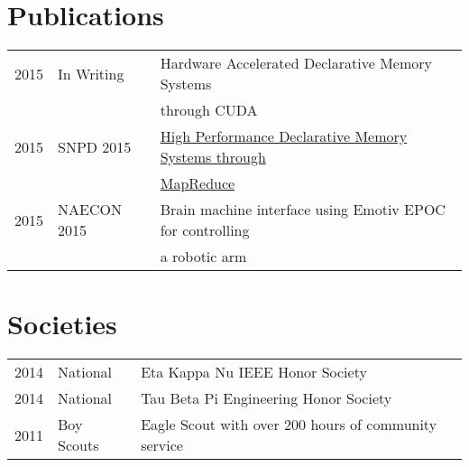 \documentclass[letterpaper]{deedy-resume} %
\begin{document}
\begin{minipage}[t]{0.66\textwidth}
\sectionspace %



\section{Publications} 

\begin{tabular}{rll}
2015 	 & In Writing  & Hardware Accelerated Declarative Memory Systems \\
 		 & 			   & through CUDA\\
2015	 & SNPD 2015   & \href{http://ieeexplore.ieee.org/xpl/articleDetails.jsp?arnumber=7176183}{High Performance Declarative Memory Systems through}\\
 		 & 			   & \href{http://ieeexplore.ieee.org/xpl/articleDetails.jsp?arnumber=7176183}{MapReduce}\\
2015 	 & NAECON 2015 & Brain machine interface using Emotiv EPOC for controlling \\
		 & 			   & a robotic arm
\end{tabular}

\sectionspace %


\section{Societies} 

\begin{tabular}{rll}
2014 & National & Eta Kappa Nu IEEE Honor Society\\
2014 & National & Tau Beta Pi Engineering Honor Society\\
2011 & Boy Scouts & Eagle Scout with over 200 hours of community service\\
\end{tabular}

\sectionspace %


\end{minipage} %

\end{document}
